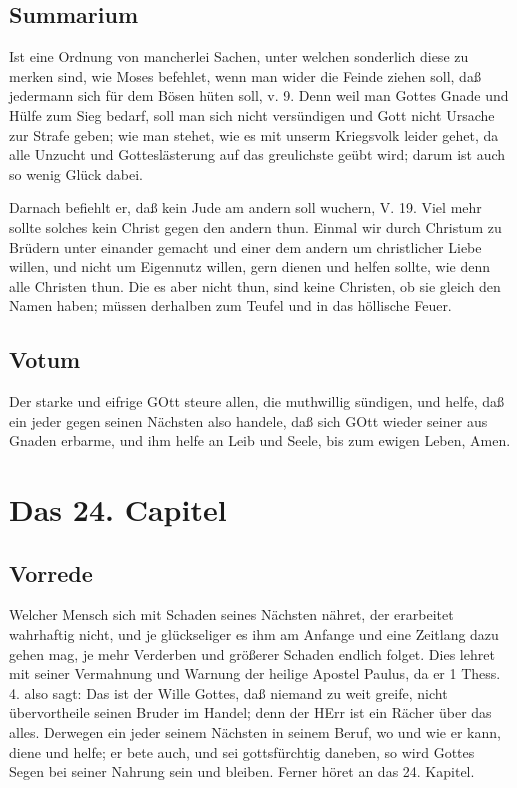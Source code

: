 \section{Summarium}

Ist eine Ordnung von mancherlei Sachen, unter welchen sonderlich diese zu merken sind, wie Moses befehlet, wenn man wider die Feinde ziehen soll, daß jedermann sich für dem Bösen hüten soll, v. 9. Denn weil man Gottes Gnade und Hülfe zum Sieg bedarf, soll man sich nicht versündigen und Gott nicht Ursache zur Strafe geben; wie man stehet, wie es mit unserm Kriegsvolk leider gehet, da alle Unzucht und Gotteslästerung
 auf das greulichste geübt wird; darum ist auch so wenig Glück dabei.

Darnach befiehlt er, daß kein Jude am andern soll wuchern, V. 19. Viel mehr sollte solches kein Christ gegen den andern thun. Einmal wir durch Christum zu Brüdern unter einander gemacht und einer dem andern um christlicher Liebe willen, und nicht um Eigennutz willen, gern dienen und helfen sollte, wie denn alle Christen thun. Die es aber nicht thun, sind keine Christen, ob sie gleich den Namen haben; müssen derhalben zum Teufel und in das höllische Feuer.

\section{Votum}

Der starke und eifrige GOtt steure allen, die muthwillig sündigen, und helfe, daß ein jeder gegen seinen Nächsten also handele, daß sich GOtt wieder seiner aus Gnaden erbarme, und ihm helfe an Leib und Seele, bis zum ewigen Leben, Amen.

\chapter{Das 24. Capitel}

\section{Vorrede}

Welcher Mensch sich mit Schaden seines Nächsten nähret, der erarbeitet wahrhaftig nicht, und je glückseliger es ihm am Anfange und eine Zeitlang dazu gehen mag, je mehr Verderben und größerer Schaden endlich folget. Dies lehret mit seiner Vermahnung und Warnung der heilige Apostel Paulus, da er 1 Thess. 4. also sagt: Das ist der Wille Gottes, daß niemand zu weit greife, nicht übervortheile seinen Bruder im Handel; denn der HErr ist ein Rächer über das alles. Derwegen ein jeder seinem Nächsten in seinem Beruf, wo und wie er kann, diene und helfe; er bete auch, und sei gottsfürchtig daneben, so wird Gottes Segen bei seiner Nahrung sein und bleiben. Ferner höret an das 24. Kapitel.

